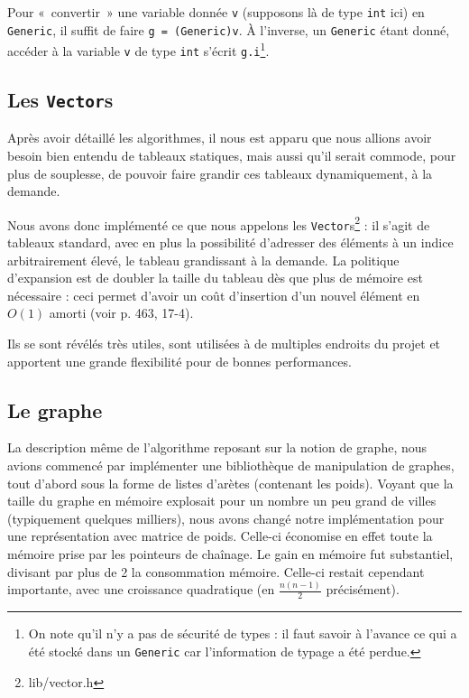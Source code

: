 \documentclass[a4paper]{article}
\begin{document}
Pour «~convertir~» une variable donnée \texttt{v} (supposons là de type \texttt{int} ici) en \texttt{Generic}, il suffit de faire \texttt{g = (Generic)v}. À l'inverse, un \texttt{Generic} étant donné, accéder à la variable \texttt{v} de type \texttt{int} s'écrit \texttt{g.i}\footnote{On note qu'il n'y a pas de sécurité de types : il faut savoir à l'avance ce qui a été stocké dans un \texttt{Generic} car l'information de typage a été perdue.}. 

\subsection{Les \texttt{Vector}s}
Après avoir détaillé les algorithmes, il nous est apparu que nous allions avoir besoin bien entendu de tableaux statiques, mais aussi qu'il serait commode, pour plus de souplesse, de pouvoir faire grandir ces tableaux dynamiquement, à la demande.

Nous avons donc implémenté ce que nous appelons les \texttt{Vector}s\footnote{lib/vector.h} : il s'agit de tableaux standard, avec en plus la possibilité d'adresser des éléments à un indice arbitrairement élevé, le tableau grandissant à la demande. La politique d'expansion est de doubler la taille du tableau dès que plus de mémoire est nécessaire : ceci permet d'avoir un coût d'insertion d'un nouvel élément en $O(1)$ amorti (voir \cite{cormen} p. 463, 17-4).

Ils se sont révélés très utiles, sont utilisées à de multiples endroits du projet et apportent une grande flexibilité pour de bonnes performances.

\subsection{Le graphe}

La description même de l'algorithme reposant sur la notion de graphe, nous avions commencé par implémenter une bibliothèque de manipulation de graphes, tout d'abord sous la forme de listes d'arètes (contenant les poids). Voyant que la taille du graphe en mémoire explosait pour un nombre un peu grand de villes (typiquement quelques milliers), nous avons changé notre implémentation pour une représentation avec matrice de poids. Celle-ci économise en effet toute la mémoire prise par les pointeurs de chaînage. Le gain en mémoire fut substantiel, divisant par plus de 2 la consommation mémoire. Celle-ci restait cependant importante, avec une croissance quadratique (en $\frac{n(n-1)}{2}$ précisément).
\end{document}
